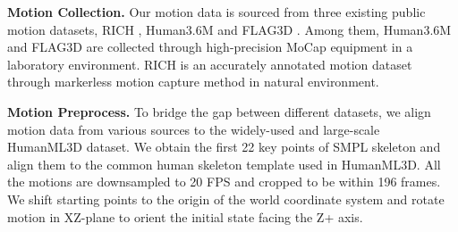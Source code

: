 \documentclass[letterpaper]{article} \usepackage{aaai24}
\begin{document}
\noindent\textbf{Motion Collection.} Our motion data is sourced from three existing public motion datasets, RICH \cite{Huang:CVPR:2022}, Human3.6M \cite{h36m_pami} and FLAG3D \cite{tang2023flag3d}. Among them, Human3.6M and FLAG3D are collected through high-precision MoCap equipment in a laboratory environment. RICH is an accurately annotated motion dataset through markerless motion capture method in natural environment.


\noindent\textbf{Motion Preprocess.} To bridge the gap between different datasets, we align motion data from various sources to the widely-used and large-scale HumanML3D dataset\cite{guo2022generating}. We obtain the first 22 key points of SMPL \cite{bogo2016smpl,pavlakos2019expressive} skeleton and align them to the common human skeleton template used in HumanML3D. All the motions are downsampled to 20 FPS and cropped to be within 196 frames. We shift starting points to the origin of the world coordinate system and rotate motion in XZ-plane to orient the initial state facing the Z+ axis.
\end{document}
